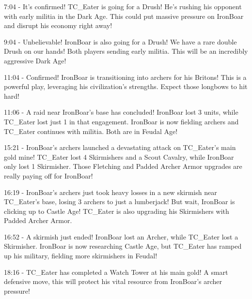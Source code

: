 7:04 - It's confirmed! TC\_Eater is going for a Drush! He's rushing his opponent with early militia in the Dark Age. This could put massive pressure on IronBoar and disrupt his economy right away! \par \vspace{1em}

9:04 - Unbelievable! IronBoar is also going for a Drush! We have a rare double Drush on our hands! Both players sending early militia. This will be an incredibly aggressive Dark Age! \par \vspace{1em}

11:04 - Confirmed! IronBoar is transitioning into archers for his Britons! This is a powerful play, leveraging his civilization's strengths. Expect those longbows to hit hard! \par \vspace{1em}

11:06 - A raid near IronBoar's base has concluded! IronBoar lost 3 units, while TC\_Eater lost just 1 in that engagement. IronBoar is now fielding archers and TC\_Eater continues with militia. Both are in Feudal Age! \par \vspace{1em}

15:21 - IronBoar's archers launched a devastating attack on TC\_Eater's main gold mine! TC\_Eater lost 4 Skirmishers and a Scout Cavalry, while IronBoar only lost 1 Skirmisher. Those Fletching and Padded Archer Armor upgrades are really paying off for IronBoar! \par \vspace{1em}

16:19 - IronBoar's archers just took heavy losses in a new skirmish near TC\_Eater's base, losing 3 archers to just a lumberjack! But wait, IronBoar is clicking up to Castle Age! TC\_Eater is also upgrading his Skirmishers with Padded Archer Armor. \par \vspace{1em}

16:52 - A skirmish just ended! IronBoar lost an Archer, while TC\_Eater lost a Skirmisher. IronBoar is now researching Castle Age, but TC\_Eater has ramped up his military, fielding more skirmishers in Feudal! \par \vspace{1em}

18:16 - TC\_Eater has completed a Watch Tower at his main gold! A smart defensive move, this will protect his vital resource from IronBoar's archer pressure! \par \vspace{1em}

